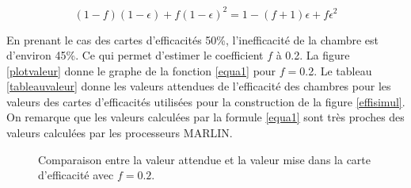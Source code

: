 \begin{equation}
(1-f)(1-\epsilon)+f(1-\epsilon)^2=1-(f+1)\epsilon+f\epsilon^2 \label{equa1}
\end{equation}

En prenant le cas des cartes d'efficacités \num{50}\%, l'inefficacité de la chambre est d'environ \num{45}\%. Ce qui permet d'estimer le coefficient $f$ à \num{0.2}. La figure \ref{plotvaleur} donne le graphe de la fonction \ref{equa1} pour $f=$\num{0.2}. Le tableau \ref{tableauvaleur} donne les valeurs attendues de l'efficacité des chambres pour les valeurs des cartes d'efficacités utilisées pour la construction de la figure \ref{effisimul}. On remarque que les valeurs calculées par la formule \ref{equa1} sont très proches des valeurs calculées par les processeurs MARLIN.
\vspace*{-0.6cm}
	\begin{figure}[ht!]
    \hfill
	\caption{Comparaison entre la valeur attendue et la valeur mise dans la carte d'efficacité avec $f=\num{0.2}$. }
	\label{Comparaison}
\end{figure}

